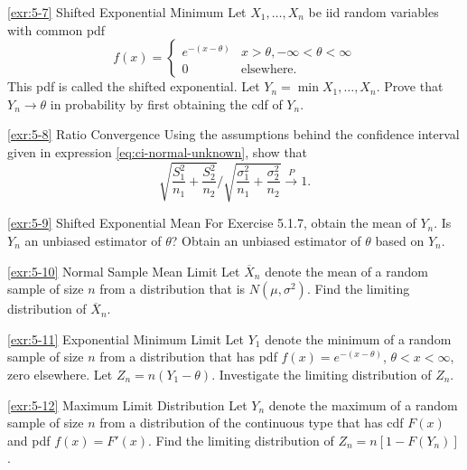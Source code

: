 \begin{exercise}{\ref{exr:5-7} Shifted Exponential Minimum}\label{exr:5-7}
Let $X_1, \ldots, X_n$ be iid random variables with common pdf
\[
f(x) = \begin{cases}
e^{-(x-\theta)} & x > \theta, -\infty < \theta < \infty \\
0 & \text{elsewhere}.
\end{cases}
\label{eq:shifted-exponential}
\]
This pdf is called the shifted exponential. Let $Y_n = \min{X_1, \ldots, X_n}$. Prove that $Y_n \to \theta$ in probability by first obtaining the cdf of $Y_n$.
\end{exercise}

\begin{exercise}{\ref{exr:5-8} Ratio Convergence}\label{exr:5-8}
Using the assumptions behind the confidence interval given in expression \eqref{eq:ci-normal-unknown}, show that
\[
\sqrt{\frac{S_1^2}{n_1} + \frac{S_2^2}{n_2}} \Big/ \sqrt{\frac{\sigma_1^2}{n_1} + \frac{\sigma_2^2}{n_2}} \xrightarrow{P} 1.
\]
\end{exercise}

\begin{exercise}{\ref{exr:5-9} Shifted Exponential Mean}\label{exr:5-9}
For Exercise 5.1.7, obtain the mean of $Y_n$. Is $Y_n$ an unbiased estimator of $\theta$? Obtain an unbiased estimator of $\theta$ based on $Y_n$.
\end{exercise}

\begin{exercise}{\ref{exr:5-10} Normal Sample Mean Limit}\label{exr:5-10}
Let $\overline{X}_n$ denote the mean of a random sample of size $n$ from a distribution that is $N(\mu, \sigma^2)$. Find the limiting distribution of $\overline{X}_n$.
\end{exercise}

\begin{exercise}{\ref{exr:5-11} Exponential Minimum Limit}\label{exr:5-11}
Let $Y_1$ denote the minimum of a random sample of size $n$ from a distribution that has pdf $f(x) = e^{-(x-\theta)}$, $\theta < x < \infty$, zero elsewhere. Let $Z_n = n(Y_1 - \theta)$. Investigate the limiting distribution of $Z_n$.
\end{exercise}

\begin{exercise}{\ref{exr:5-12} Maximum Limit Distribution}\label{exr:5-12}
Let $Y_n$ denote the maximum of a random sample of size $n$ from a distribution of the continuous type that has cdf $F(x)$ and pdf $f(x) = F'(x)$. Find the limiting distribution of $Z_n = n[1 - F(Y_n)]$.
\end{exercise}

